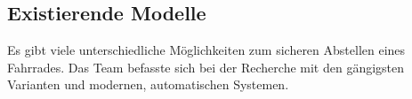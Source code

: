 \subsection{Existierende Modelle}

Es gibt viele unterschiedliche Möglichkeiten zum sicheren Abstellen eines Fahrrades. Das Team befasste sich bei der Recherche mit den gängigsten Varianten und modernen, automatischen Systemen.













